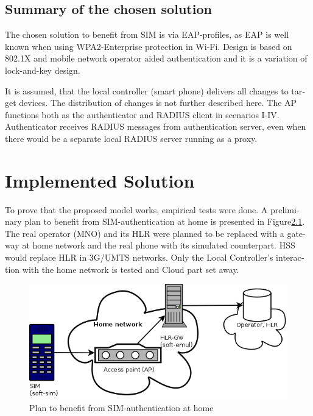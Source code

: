 \documentclass[12pt,a4paper,english]{tutthesis}
\begin{document}
\begin{otherlanguage}{english}
\section{Summary of the chosen solution}
\label{sec-4-7}


The chosen solution to benefit from SIM is via EAP-profiles, as EAP
is well known when using WPA2-Enterprise protection in Wi-Fi.
Design is based on 802.1X and mobile network operator aided
authentication
and it is a variation of lock-and-key design.


It is assumed, that  the local controller (smart phone)
delivers all changes to target devices.
The distribution of changes\cite{silverajan2015collaborative} is not
further described here.  The AP functions both as the authenticator
and RADIUS client in scenarios I-IV.  Authenticator receives RADIUS
messages from authentication server, even when there would be a
separate local RADIUS server running as a proxy.



\chapter{Implemented Solution}
\label{sec-5}


To prove that the proposed model works, empirical tests were done.
A preliminary plan to benefit from SIM-authentication at home is
presented in Figure\ref{fig:sim-pre}. The real operator (MNO) and its HLR were 
planned to be replaced with a gateway at home network and the real phone
with its simulated counterpart. HSS would replace HLR in 3G/UMTS
networks. 
Only the Local Controller's interaction with the home network is
tested and Cloud part set away.

\begin{figure}[htb]
\centering
\includegraphics[width=.9\linewidth]{phone-soft-hlr.png}
\caption{\label{fig:sim-pre}Plan to benefit from SIM-authentication at home}
\end{figure}


\end{otherlanguage}
\end{document}
